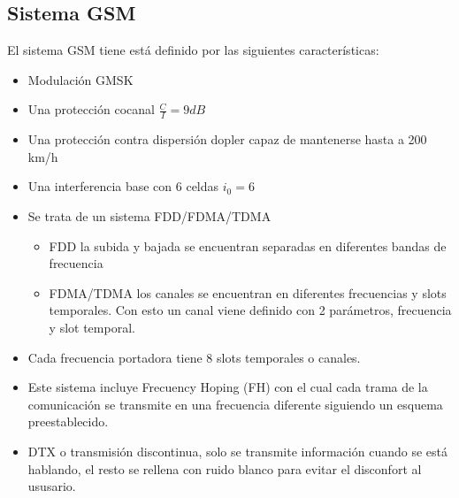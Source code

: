 \subsection{Sistema GSM}
\label{sub:GSM}
El sistema GSM tiene está definido por las siguientes características:
\begin{itemize}
	\item Modulación GMSK
	\item Una protección cocanal $\frac{C}{I}=9dB$
	\item Una protección contra dispersión dopler capaz de mantenerse hasta a 200 km/h
	\item Una interferencia base con 6 celdas $i_0=6$
	\item Se trata de un sistema FDD/FDMA/TDMA
	\begin{itemize}
		\item FDD la subida y bajada se encuentran separadas en diferentes bandas de frecuencia
		\item FDMA/TDMA los canales se encuentran en diferentes frecuencias y slots temporales. Con esto un canal viene definido con 2 parámetros, frecuencia y slot temporal.
	\end{itemize}
	\item Cada frecuencia portadora tiene 8 slots temporales o canales.
	\item Este sistema incluye Frecuency Hoping (FH) con el cual cada trama de la comunicación se transmite en una frecuencia diferente siguiendo un esquema preestablecido.
	\item DTX o transmisión discontinua, solo se transmite información cuando se está hablando, el resto se rellena con ruido blanco para evitar el disconfort al ususario.
\end{itemize}
